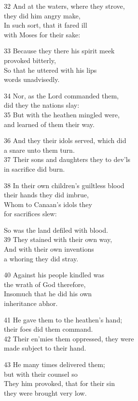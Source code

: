 32 And at the waters, where they strove,\\
they did him angry make,\\
In such sort, that it fared ill\\
with Moses for their sake:

33 Because they there his spirit meek\\
provoked bitterly,\\
So that he uttered with his lips\\
words unadvisedly.

34 Nor, as the Lord commanded them,\\
did they the nations slay:\\
35 But with the heathen mingled were,\\
and learned of them their way.

36 And they their idols served, which did\\
a snare unto them turn.\\
37 Their sons and daughters they to dev’ls\\
in sacrifice did burn.

38 In their own children’s guiltless blood\\
their hands they did imbrue,\\
Whom to Canaan’s idols they\\
for sacrifices slew:

So was the land defiled with blood.\\
39 They stained with their own way,\\
And with their own inventions\\
a whoring they did stray.

40 Against his people kindled was\\
the wrath of God therefore,\\
Insomuch that he did his own\\
inheritance abhor.

41 He gave them to the heathen’s hand;\\
their foes did them command.\\
42 Their en’mies them oppressed, they were\\
made subject to their hand.

43 He many times delivered them;\\
but with their counsel so\\
They him provoked, that for their sin\\
they were brought very low.

